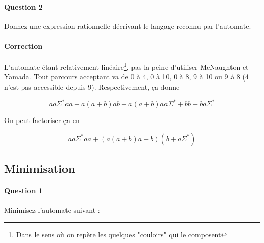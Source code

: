 \documentclass{article}[11pt]
\theoremstyle{definition}
\begin{document}
\paragraph{Question 2} Donnez une expression rationnelle décrivant le langage reconnu par l'automate.

\paragraph{Correction} L'automate étant relativement linéaire\footnote{Dans le sens où on repère les quelques "couloirs" qui le composent}, pas la peine d'utiliser McNaughton et Yamada. Tout parcours acceptant va de 0 à 4, 0 à 10, 0 à 8, 9 à 10 ou 9 à 8 (4 n'est pas accessible depuis 9). Respectivement, ça donne 

\[
aa\Sigma^*aa + a(a+b)ab + a(a+b)aa\Sigma^* + bb + ba\Sigma^* 
\]

On peut factoriser ça en 

\[
aa\Sigma^*aa + (a(a+b)a+b)(b+a\Sigma^*)
\]

\subsection{Minimisation}

\paragraph{Question 1} Minimisez l'automate suivant :
\end{document}
